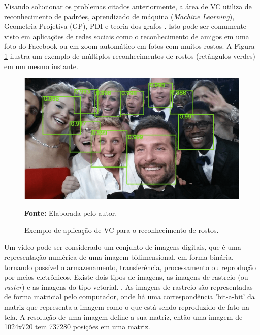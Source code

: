 Visando solucionar os problemas citados anteriormente, a área de VC utiliza de reconhecimento de padrões, aprendizado de máquina (\textit{Machine Learning}), Geometria Projetiva (GP), PDI e teoria dos grafos \cite{prince2012computer}. Isto pode ser comumente visto em aplicações de redes sociais como o reconhecimento de amigos em uma foto do Facebook ou em zoom automático em fotos com muitos rostos. A Figura \ref{fig:exemplo-vc} ilustra um exemplo de múltiplos reconhecimentos de rostos (retângulos verdes) em um mesmo instante.

\begin{figure}[H]
\caption{Exemplo de aplicação de VC para o reconhecimento de rostos.}
\centering \includegraphics[scale=0.6]{img/figura-1.png}
 
{\fontsize{11}{11}\selectfont \textbf{Fonte:} Elaborada pelo autor.}
\label{fig:exemplo-vc}
\end{figure}


Um vídeo pode ser considerado um conjunto de imagens digitais, que é uma representação numérica de uma imagem bidimensional, em forma binária, tornando possível o armazenamento, transferência, processamento ou reprodução por meios eletrônicos. Existe dois tipos de imagens, as imagens de rastreio (ou \textit{raster}) e as imagens do tipo vetorial. \cite{parker2010algorithms-UPPERCASE}. As imagens de rastreio são representadas de forma matricial pelo computador, onde há uma correspondência 'bit-a-bit' da matriz que representa a imagem como o que está sendo reproduzido de fato na tela. A resolução de uma imagem define a sua matriz, então uma imagem de 1024x720 tem 737280 posições em uma matriz. 

